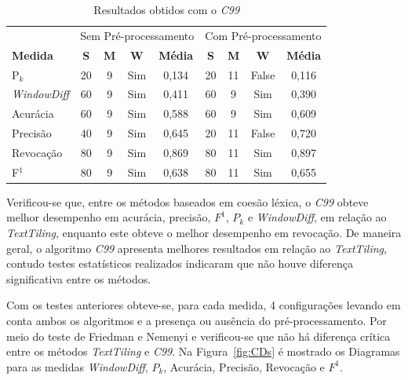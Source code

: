 \begin{table}[!h]
	\centering
	\begin{tabular}{|l||c|c|c|c||c|c|c|c|} \hline

		& \multicolumn{4}{c||}{Sem Pré-processamento} 
		& \multicolumn{4}{c|}{Com Pré-processamento}\\			

		\textbf{Medida} & 
		\textbf{S} & 
		\textbf{M} & 
		\textbf{W} & 
		\textbf{Média} &
		\textbf{S} & 
		\textbf{M} & 
		\textbf{W} & 
		\textbf{Média} \\	\hline

		P$_k$				& 20 & 9 & Sim & 0,134& 20 & 11 & False	& 0,116 \\ \hline  
		\textit{WindowDiff}	& 60 & 9 & Sim & 0,411& 60 &  9 & Sim 	& 0,390 \\ \hline  
		Acurácia			& 60 & 9 & Sim & 0,588& 60 &  9 & Sim 	& 0,609 \\ \hline  
		Precisão			& 40 & 9 & Sim & 0,645& 20 & 11 & False	& 0,720 \\ \hline  
		Revocação			& 80 & 9 & Sim & 0,869& 80 & 11 & Sim 	& 0,897 \\ \hline  
		F$^1$				& 80 & 9 & Sim & 0,638& 80 & 11 & Sim 	& 0,655 \\ \hline  

	\end{tabular}
	\caption{Resultados obtidos com o \textit{C99}}
	\label{tab:resultadosc99}
\end{table}



Verificou-se que, entre os métodos baseados em coesão léxica, o \textit{C99} obteve melhor desempenho em acurácia, precisão, $F^1$, $P_k$ e \textit{WindowDiff}, em relação ao \textit{TextTiling}, enquanto este obteve o melhor desempenho em revocação. De maneira geral, o algoritmo \textit{C99} apresenta melhores resultados em relação ao \textit{TextTiling}, contudo testes estatísticos realizados indicaram que não houve diferença significativa entre os métodos. 




Com os testes anteriores obteve-se, para cada medida, 4 configurações levando em conta ambos os algoritmos e a presença ou ausência do pré-processamento. Por meio do teste de Friedman e Nemenyi e verificou-se que não há diferença crítica entre os métodos \textit{TextTiling} e \textit{C99}. Na Figura~\ref{fig:CDs} é mostrado os Diagramas para as medidas \textit{WindowDiff}, $P_k$, Acurácia, Precisão, Revocação e $F^1$.	

